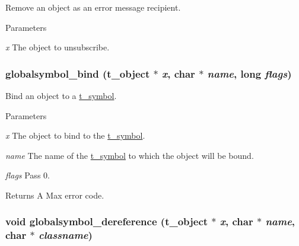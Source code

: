 Remove an object as an error message recipient. 
\begin{DoxyParams}{Parameters}
\item[{\em x}]The object to unsubscribe. \end{DoxyParams}
\hypertarget{group__misc_gaa121ff996fcf9cfb28d1c7c11eebc428}{
\subsubsection[{globalsymbol\_\-bind}]{ globalsymbol\_\-bind ({\bf t\_\-object} $\ast$ {\em x}, \/  char $\ast$ {\em name}, \/  long {\em flags})}}
\label{group__misc_gaa121ff996fcf9cfb28d1c7c11eebc428}


Bind an object to a \hyperlink{structt__symbol}{t\_\-symbol}. 
\begin{DoxyParams}{Parameters}
\item[{\em x}]The object to bind to the \hyperlink{structt__symbol}{t\_\-symbol}. \item[{\em name}]The name of the \hyperlink{structt__symbol}{t\_\-symbol} to which the object will be bound. \item[{\em flags}]Pass 0. \end{DoxyParams}
\begin{DoxyReturn}{Returns}
A Max error code. 
\end{DoxyReturn}
\hypertarget{group__misc_ga5a4773570564ab729cbe4031cfff0b45}{
\subsubsection[{globalsymbol\_\-dereference}]{\setlength{\rightskip}{0pt plus 5cm}void globalsymbol\_\-dereference ({\bf t\_\-object} $\ast$ {\em x}, \/  char $\ast$ {\em name}, \/  char $\ast$ {\em classname})}}
\label{group__misc_ga5a4773570564ab729cbe4031cfff0b45}


